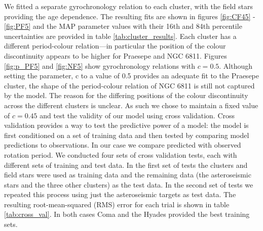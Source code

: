 \documentclass[10pt,preprint]{aastex}
\begin{document}
We fitted a separate gyrochronology relation to each cluster, with the field stars providing the age dependence.
The resulting fits are shown in figures \ref{fig:CF45} - \ref{fig:PF5} and the MAP parameter values with their 16th and 84th percentile uncertainties are provided in table \ref{tab:cluster_results}.
Each cluster has a different period-colour relation---in particular the position of the colour discontinuity appears to be higher for Praesepe and NGC 6811.
Figures \ref{fig:p_PF5} and \ref{fig:NF5} show gyrochronology relations with $c=0.5$.
Although setting the parameter, c to a value of 0.5 provides an adequate fit to the Praesepe cluster, the shape of the period-colour relation of NGC 6811 is still not captured by the model.
The reason for the differing positions of the colour discontinuity across the different clusters is unclear.
As such we chose to maintain a fixed value of $c=0.45$ and test the validity of our model using cross validation.
Cross validation provides a way to test the predictive power of a model: the model is first conditioned on a set of training data and then tested by comparing model predictions to observations.
In our case we compare predicted with observed rotation period.
We conducted four sets of cross validation tests, each with different sets of training and test data.
In the first set of tests the clusters and field stars were used as training data and the remaining data (the asteroseismic stars and the three other clusters) as the test data.
In the second set of tests we repeated this process using just the asteroseismic targets as test data.
The resulting root-mean-squared (RMS) error for each trial is shown in table \ref{tab:cross_val}.
In both cases Coma and the Hyades provided the best training sets.
\end{document}
